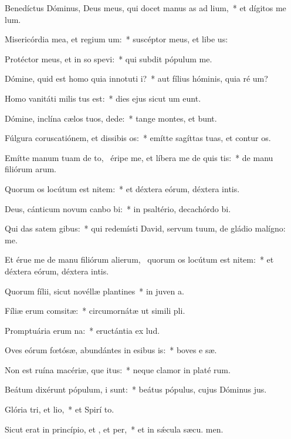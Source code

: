 \item Benedíctus Dóminus, Deus meus, qui docet manus as ad lium,~* et dígitos me  lum.
\item Misericórdia mea, et regium um:~* suscéptor meus, et libe us:
\item Protéctor meus, et in so spevi:~* qui subdit pópulum   me.
\item Dómine, quid est homo quia innotuti i?~* aut fílius hóminis, quia ré um?
\item Homo vanitáti milis tus est:~* dies ejus sicut um eunt.
\item Dómine, inclína cælos tuos,  dede:~* tange montes, et bunt.
\item Fúlgura coruscatiónem, et dissibis os:~* emítte sagíttas tuas, et contur os.
\item Emítte manum tuam de to,~\pscross{} éripe me, et líbera me de quis tis:~* de manu filiórum arum.
\item Quorum os locútum est nitem:~* et déxtera eórum, déxtera intis.
\item Deus, cánticum novum canbo bi:~* in psaltério, decachórdo  bi.
\item Qui das satem gibus:~* qui redemísti David, servum tuum, de gládio malígno:  me.
\item Et érue me de manu filiórum alierum,~\pscross{} quorum os locútum est nitem:~* et déxtera eórum, déxtera intis.
\item Quorum fílii, sicut novéllæ plantines~* in juven a.
\item Fíliæ erum comsitæ:~* circumornátæ ut simili pli.
\item Promptuária erum na:~* eructántia ex   lud.
\item Oves eórum fœtósæ, abundántes in esibus is:~* boves e sæ.
\item Non est ruína macériæ, que itus:~* neque clamor in platé rum.
\item Beátum dixérunt pópulum, i  sunt:~* beátus pópulus, cujus Dóminus  jus.
\item Glória tri, et lio,~* et Spirí to.
\item Sicut erat in princípio, et , et per,~* et in sǽcula sæcu. men.
